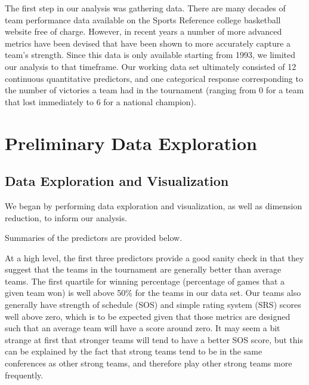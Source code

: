 \documentclass[10pt,a4paper, hidelinks]{article} %
\begin{document}
The first step in our analysis was gathering data. There are many decades of team performance data available on the Sports Reference college basketball website free of charge. However, in recent years a number of more advanced metrics have been devised that have been shown to more accurately capture a team's strength. Since this data is only available starting from 1993, we limited our analysis to that timeframe. Our working data set ultimately consisted of 12 continuous quantitative predictors, and one categorical response corresponding to the number of victories a team had in the tournament (ranging from 0 for a team that lost immediately to 6 for a national champion).

\section{Preliminary Data Exploration}

\subsection{Data Exploration and Visualization}
We began by performing data exploration and visualization, as well as dimension reduction, to inform our analysis.

Summaries of the predictors are provided below.


At a high level, the first three predictors provide a good sanity check in that they suggest that the teams in the tournament are generally better than average teams. The first quartile for winning percentage (percentage of games that a given team won) is well above 50\% for the teams in our data set. Our teams also generally have strength of schedule (SOS) and simple rating system (SRS) scores well above zero, which is to be expected given that those metrics are designed such that an average team will have a score around zero. It may seem a bit strange at first that stronger teams will tend to have a better SOS score, but this can be explained by the fact that strong teams tend to be in the same conferences as other strong teams, and therefore play other strong teams more frequently.
\end{document}
